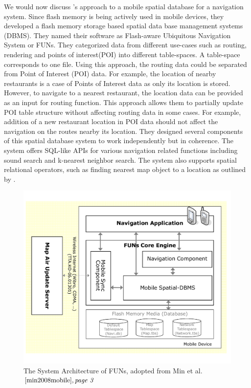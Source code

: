 We would now discuss \citet{min2008mobile}'s approach to a mobile spatial database for a navigation system. Since flash memory is being actively used in mobile devices, they developed a flash memory storage based spatial data base management systems (DBMS). They named their software as Flash-aware Ubiquitous Navigation System or FUNs. They categorized data from different use-cases such as routing, rendering and points of interest(POI) into different table-spaces. A table-space corresponds to one file. Using this approach, the routing data could be separated from Point of Interest (POI) data. For example, the location of nearby restaurants is a case of Points of Interest data as only its location is stored. However, to navigate to a nearest restaurant, the location data can be provided as an input for routing function. This approach allows them to partially update POI table structure without affecting routing data in some cases. For example, addition of a new restaurant location in POI data should not affect the navigation on the routes nearby its location. They designed several components of this spatial database system to work independently but in coherence. The system offers SQL-like APIs for various navigation related functions including sound search and k-nearest neighbor search. The system also supports spatial relational operators, such as finding nearest map object to a location as outlined by \citet{lee1998perf}. \\
\begin{figure}
\includegraphics[scale=.31]{FUNsArchitecture.png}
\caption{The System Architecture of FUNs, adopted from Min et al.$\cite{min2008mobile}, \textit{page 3}$}
\label{fg:sysArchFun}
\end{figure}

